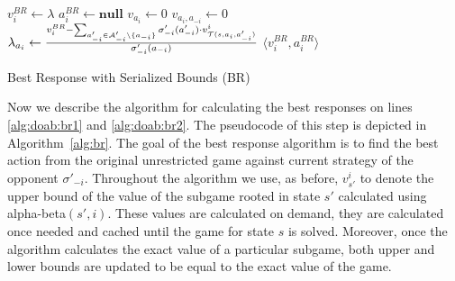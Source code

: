 \begin{algorithm2e}[t]
\small
{}
$v^{BR}_i \leftarrow \lambda$ \;
$a_i^{BR} \leftarrow \textbf{null}$ \;
 {%
	$v_{a_i} \leftarrow 0$\;
	 {\label{alg:br:opp}
    $v_{a_i,a_{-i}} \leftarrow 0$\;
		$\lambda_{a_i} \leftarrow \frac{v_i^{BR} - \sum_{a'_{-i} \in \mathcal{A}'_{-i} \setminus \lbrace a_{-i} \rbrace} \sigma'_{-i}(a'_{-i}) \cdot v^i_{\mathcal{T}(s,a_i,a'_{-i})}}{\sigma'_{-i}(a_{-i})}$\; \label{alg:br:bound}
	}
}
\Return $\langle v_i^{BR}, a_i^{BR} \rangle$
\caption{Best Response with Serialized Bounds (BR)}\label{alg:br}
\end{algorithm2e}

Now we describe the algorithm for calculating the best responses on lines \ref{alg:doab:br1} and \ref{alg:doab:br2}.
The pseudocode of this step is depicted in Algorithm~\ref{alg:br}.
The goal of the best response algorithm is to find the best action from the original unrestricted game against current strategy of the opponent $\sigma'_{-i}$.
Throughout the algorithm we use, as before, $v^i_{s'}$ to denote the upper bound of the value of the subgame rooted in state $s'$ calculated using alpha-beta$(s',i)$.
These values are calculated on demand, \ie they are calculated once needed and cached until the game for state $s$ is solved.
Moreover, once the algorithm calculates the exact value of a particular subgame, both upper and lower bounds are updated to be equal to the exact value of the game.

